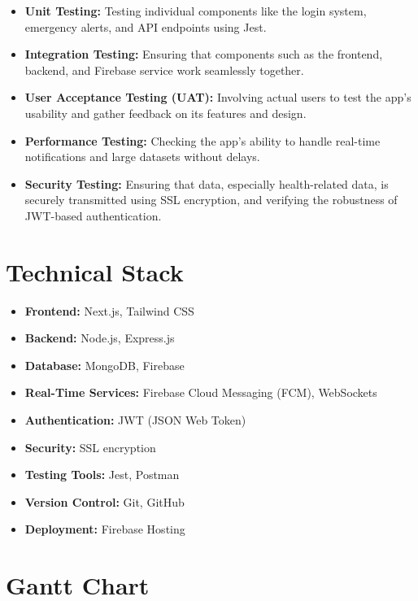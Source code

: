 \begin{itemize}
    \item \textbf{Unit Testing:} Testing individual components like the login system, emergency alerts, and API endpoints using Jest\cite{jest_docs}.
    \item \textbf{Integration Testing:} Ensuring that components such as the frontend, backend, and Firebase service work seamlessly together\cite{firebase_testing}.
    \item \textbf{User Acceptance Testing (UAT):} Involving actual users to test the app’s usability and gather feedback on its features and design\cite{uat_testing}.
    \item \textbf{Performance Testing:} Checking the app's ability to handle real-time notifications and large datasets without delays\cite{performance_testing}.
    \item \textbf{Security Testing:} Ensuring that data, especially health-related data, is securely transmitted using SSL encryption, and verifying the robustness of JWT-based authentication\cite{security_testing}\cite{jwt_security}.
\end{itemize}

\section{Technical Stack}

\begin{itemize}
    \item \textbf{Frontend:} Next.js, Tailwind CSS
    \item \textbf{Backend:} Node.js, Express.js
    \item \textbf{Database:} MongoDB, Firebase
    \item \textbf{Real-Time Services:} Firebase Cloud Messaging (FCM), WebSockets
    \item \textbf{Authentication:} JWT (JSON Web Token)
    \item \textbf{Security:} SSL encryption
    \item \textbf{Testing Tools:} Jest, Postman
    \item \textbf{Version Control:} Git, GitHub
    \item \textbf{Deployment:} Firebase Hosting
\end{itemize}

\section{Gantt Chart}


